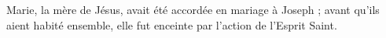 Marie, la mère de Jésus, avait été accordée en mariage à Joseph ; avant qu’ils aient habité ensemble, elle fut enceinte par l’action de l’Esprit Saint.